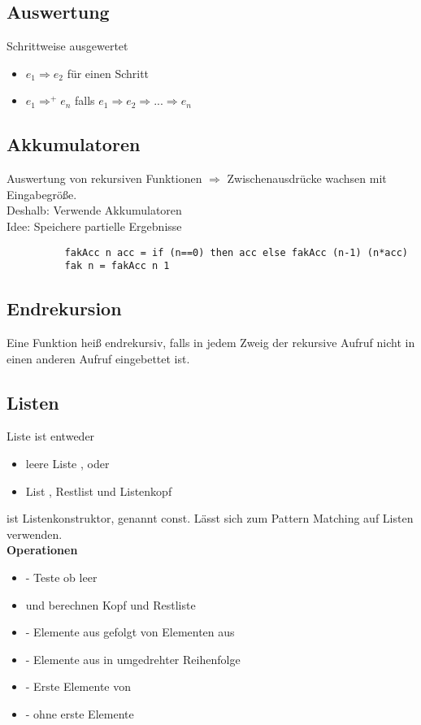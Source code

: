 \subsection{Auswertung}%
\label{hsk:sub:auswertung}
Schrittweise ausgewertet
\begin{itemize}
  \item \(e_1 \Rightarrow e_2\) für einen Schritt
  \item \(e_1 \Rightarrow^+ e_n \) falls \(e_1 \Rightarrow e_2 \Rightarrow ... \Rightarrow e_n\)
\end{itemize}
        
\subsection{Akkumulatoren}%
\label{hsk:sub:akkumulatoren}
Auswertung von rekursiven Funktionen \(\Rightarrow\) Zwischenausdrücke wachsen mit Eingabegröße.\\
Deshalb: Verwende Akkumulatoren\\
Idee: Speichere partielle Ergebnisse
\begin{lstlisting}
          fakAcc n acc = if (n==0) then acc else fakAcc (n-1) (n*acc)
          fak n = fakAcc n 1
\end{lstlisting}

\subsection{Endrekursion}%
\label{hsk:sub:endrekursion}
Eine Funktion heiß endrekursiv, falls in jedem Zweig der rekursive Aufruf nicht in einen anderen Aufruf eingebettet ist.

\subsection{Listen}%
\label{hsk:sub:listen}
Liste ist entweder
\begin{itemize}
  \item leere Liste \code{[]}, oder
  \item List , Restlist  und Listenkopf 
\end{itemize}
\code{(:)} ist Listenkonstruktor, genannt const.
Lässt sich zum Pattern Matching auf Listen verwenden.\\

\textbf{Operationen}
\begin{itemize}
  \item {} - Teste ob leer
  \item {} und  berechnen Kopf und Restliste
  \item {} - Elemente aus  gefolgt von Elementen aus 
  \item {} - Elemente aus  in umgedrehter Reihenfolge
  \item {} - Erste  Elemente von 
  \item {} -  ohne erste  Elemente
\end{itemize}
          
